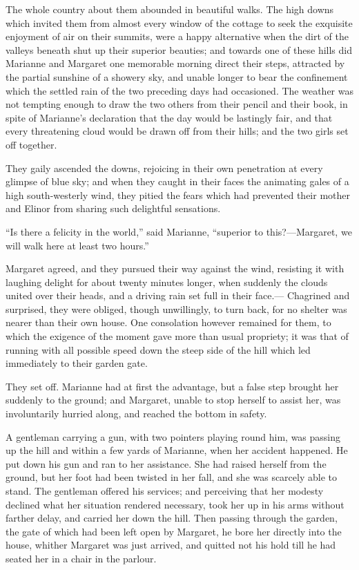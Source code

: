 \documentclass{article}
\begin{document}
The whole country about them abounded in beautiful walks.
The high downs which invited them from almost every window
of the cottage to seek the exquisite enjoyment of air
on their summits, were a happy alternative when the dirt
of the valleys beneath shut up their superior beauties;
and towards one of these hills did Marianne and Margaret
one memorable morning direct their steps, attracted by the
partial sunshine of a showery sky, and unable longer to bear
the confinement which the settled rain of the two preceding
days had occasioned.  The weather was not tempting enough
to draw the two others from their pencil and their book,
in spite of Marianne's declaration that the day would
be lastingly fair, and that every threatening cloud would
be drawn off from their hills; and the two girls set off
together.

They gaily ascended the downs, rejoicing in their own
penetration at every glimpse of blue sky; and when they
caught in their faces the animating gales of a high
south-westerly wind, they pitied the fears which had prevented
their mother and Elinor from sharing such delightful sensations.

``Is there a felicity in the world,'' said Marianne,
``superior to this?---Margaret, we will walk here at least
two hours.''

Margaret agreed, and they pursued their way against
the wind, resisting it with laughing delight for about
twenty minutes longer, when suddenly the clouds united over
their heads, and a driving rain set full in their face.---%
Chagrined and surprised, they were obliged, though unwillingly,
to turn back, for no shelter was nearer than their own house.
One consolation however remained for them, to which the
exigence of the moment gave more than usual propriety;
it was that of running with all possible speed down the steep
side of the hill which led immediately to their garden gate.

They set off.  Marianne had at first the advantage,
but a false step brought her suddenly to the ground;
and Margaret, unable to stop herself to assist her,
was involuntarily hurried along, and reached the bottom
in safety.

A gentleman carrying a gun, with two pointers
playing round him, was passing up the hill and within
a few yards of Marianne, when her accident happened.
He put down his gun and ran to her assistance.  She had
raised herself from the ground, but her foot had been
twisted in her fall, and she was scarcely able to stand.
The gentleman offered his services; and perceiving that her
modesty declined what her situation rendered necessary,
took her up in his arms without farther delay, and carried
her down the hill.  Then passing through the garden,
the gate of which had been left open by Margaret, he bore her
directly into the house, whither Margaret was just arrived,
and quitted not his hold till he had seated her in a chair
in the parlour.
\end{document}
